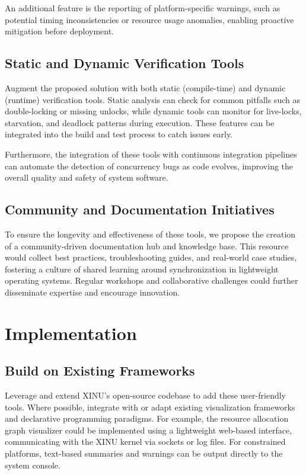 \documentclass[conference,a4paper]{IEEEtran}
\begin{document}
An additional feature is the reporting of platform-specific warnings, such as potential timing inconsistencies or resource usage anomalies, enabling proactive mitigation before deployment.

\subsection{Static and Dynamic Verification Tools}

Augment the proposed solution with both static (compile-time) and dynamic (runtime) verification tools. Static analysis can check for common pitfalls such as double-locking or missing unlocks, while dynamic tools can monitor for live-locks, starvation, and deadlock patterns during execution. These features can be integrated into the build and test process to catch issues early.

Furthermore, the integration of these tools with continuous integration pipelines can automate the detection of concurrency bugs as code evolves, improving the overall quality and safety of system software.

\subsection{Community and Documentation Initiatives}

To ensure the longevity and effectiveness of these tools, we propose the creation of a community-driven documentation hub and knowledge base. This resource would collect best practices, troubleshooting guides, and real-world case studies, fostering a culture of shared learning around synchronization in lightweight operating systems. Regular workshops and collaborative challenges could further disseminate expertise and encourage innovation.

\section{Implementation}

\subsection{Build on Existing Frameworks}

Leverage and extend XINU’s open-source codebase to add these user-friendly tools. Where possible, integrate with or adapt existing visualization frameworks and declarative programming paradigms. For example, the resource allocation graph visualizer could be implemented using a lightweight web-based interface, communicating with the XINU kernel via sockets or log files. For constrained platforms, text-based summaries and warnings can be output directly to the system console.
\end{document}
